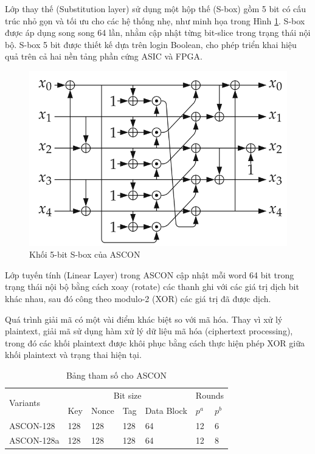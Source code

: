 Lớp thay thế (Substitution layer) sử dụng một hộp thế (S-box) gồm 5 bit có cấu trúc nhỏ gọn và tối ưu cho các hệ thống nhẹ, như minh họa trong Hình \ref{fig:s-box}. S-box được áp dụng song song 64 lần, nhằm cập nhật từng bit-slice trong trạng thái nội bộ. S-box 5 bit được thiết kế dựa trên login Boolean, cho phép triển khai hiệu quả trên cả hai nền tảng phần cứng ASIC và FPGA.

\begin{figure}
    \centering
    \includegraphics[width=0.6\linewidth]{s-box.png}
    \caption{Khối 5-bit S-box của ASCON}
    \label{fig:s-box}
\end{figure}

Lớp tuyến tính (Linear Layer) trong ASCON cập nhật mỗi word 64 bit trong trạng thái nội bộ bằng cách xoay (rotate) các thanh ghi với các giá trị dịch bit khác nhau, sau đó công theo modulo-2 (XOR) các giá trị đã được dịch.

Quá trình giải mã có một vài điểm khác biệt so với mã hóa. Thay vì xử lý plaintext, giải mã sử dụng hàm xử lý dữ liệu mã hóa (ciphertext processing), trong đó các khối plaintext được khôi phục bằng cách thực hiện phép XOR giữa khối plaintext và trạng thai hiện tại.

\begin{table}[ht]
\centering
\small
\caption{Bảng tham số cho ASCON}
\begin{tabular}{|p{3cm}|p{1.5cm}|p{1.5cm}|p{1.5cm}|p{2.8cm}|p{1cm}|p{1cm}|}
    \hline
    \multirow{2}{*}{Variants} & \multicolumn{4}{c|}{Bit size} & \multicolumn{2}{c|}{Rounds} \\
    \cline{2-7}
    & Key & Nonce & Tag & Data Block & $p^a$ & $p^b$ \\
    \hline
    ASCON-128 & 128 & 128 & 128 & 64 & 12 & 6 \\
    \hline
    ASCON-128a & 128 & 128 & 128 & 64 & 12 & 8 \\
    \hline
\end{tabular}
\label{tab:ascon_parameter}
\end{table}

